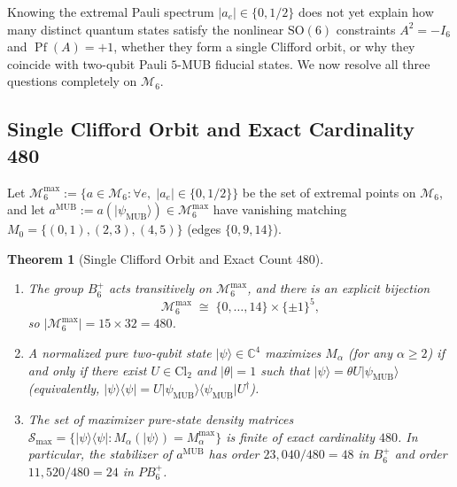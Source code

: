 \documentclass[11pt,a4paper]{article}
\theoremstyle{plain}
\newtheorem{theorem}{Theorem}[section]
\theoremstyle{definition}
\theoremstyle{remark}
\newcommand{\C}{\mathbb{C}}
\newcommand{\ket}[1]{\lvert #1 \rangle}
\newcommand{\ketbra}[2]{\lvert #1 \rangle\langle #2 \rvert}
\newcommand{\Pf}{\operatorname{Pf}}
\newcommand{\SO}{\mathrm{SO}}
\newcommand{\Cl}{\mathrm{Cl}}
\newcommand{\Mman}{\mathcal{M}_6}
\newcommand{\Bplus}{B_6^+}
\newcommand{\PBplus}{PB_6^+}
\newcommand{\psimub}{\ket{\psi_{\mathrm{MUB}}}}
\begin{document}
Knowing the extremal Pauli spectrum $\lvert a_e\rvert \in \{0, 1/2\}$ does not yet explain how many distinct quantum states satisfy the nonlinear $\SO(6)$ constraints $A^2 = -I_6$ and $\Pf(A) = +1$, whether they form a single Clifford orbit, or why they coincide with two-qubit Pauli $5$-MUB fiducial states. We now resolve all three questions completely on $\Mman$.

\subsection{Single Clifford Orbit and Exact Cardinality 480}

Let $\Mman^{\max} := \{a \in \Mman : \forall e,\; \lvert a_e\rvert \in \{0, 1/2\}\}$ be the set of extremal points on $\Mman$, and let $a^{\mathrm{MUB}} := a(\psimub) \in \Mman^{\max}$ have vanishing matching $M_0 = \{(0,1), (2,3), (4,5)\}$ (edges $\{0, 9, 14\}$).

\begin{theorem}[Single Clifford Orbit and Exact Count $480$]
\label{thm:480}
\leavevmode
\begin{enumerate}[label=\textup{(\alph*)}, leftmargin=2em]
  \item The group $\Bplus$ acts transitively on $\Mman^{\max}$, and there is an explicit bijection
  \begin{equation}
    \label{eq:bijection-480}
    \Mman^{\max} \;\cong\; \{0,\dots,14\} \times \{\pm 1\}^5,
  \end{equation}
  so $\lvert \Mman^{\max}\rvert = 15 \times 32 = 480$.
  \item A normalized pure two-qubit state $\ket{\psi} \in \C^4$ maximizes $M_\alpha$ (for any $\alpha \ge 2$) if and only if there exist $U \in \Cl_2$ and $\lvert\theta\rvert = 1$ such that $\ket{\psi} = \theta U \psimub$ (equivalently, $\ketbra{\psi}{\psi} = U \ketbra{\psi_{\mathrm{MUB}}}{\psi_{\mathrm{MUB}}} U^\dagger$).
  \item The set of maximizer pure-state density matrices $\mathcal{S}_{\max} = \{\ketbra{\psi}{\psi} : M_\alpha(\ket{\psi}) = M_\alpha^{\max}\}$ is finite of exact cardinality $480$. In particular, the stabilizer of $a^{\mathrm{MUB}}$ has order $23{,}040/480 = 48$ in $\Bplus$ and order $11{,}520/480 = 24$ in $\PBplus$.
\end{enumerate}
\end{theorem}
\end{document}
